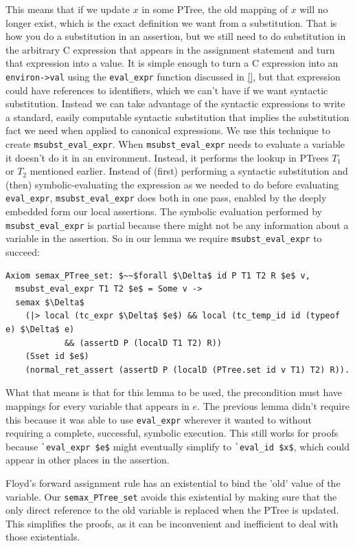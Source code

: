 \documentclass{puthesis}
\begin{document}
This means that if we update $x$ in some PTree, the old mapping of $x$
will no longer exist, which is the exact definition we want from a
substitution. That is how you do a substitution in an assertion, but
we still need to do substitution in the arbitrary C expression that
appears in the assignment statement and turn that expression into a
value. It is simple enough to turn a C expression into an
\lstinline|environ->val| using the \lstinline|eval_expr| function
discussed in \ref{}, but that expression could have references to
identifiers, which we can't have if we want syntactic
substitution. Instead we can take advantage of the syntactic
expressions to write a standard, easily computable syntactic
substitution that implies the substitution fact we need when applied
to canonical expressions. We use this technique to create
\lstinline|msubst_eval_expr|.  When \lstinline|msubst_eval_expr| needs
to evaluate a variable it doesn't do it in an environment. Instead, it
performs the lookup in PTrees $T_1$ or $T_2$ mentioned
earlier. Instead of (first) performing a syntactic substitution and
(then) symbolic-evaluating the expression as we needed to do before
evaluating \lstinline|eval_expr|, \lstinline|msubst_eval_expr| does both in one
pass, enabled by the deeply embedded form our local assertions.  The
symbolic evaluation performed by \lstinline|msubst_eval_expr| is partial
because there might not be any information about a variable in the
assertion. So in our lemma we require \lstinline|msubst_eval_expr| to
succeed:

\begin{lstlisting}
Axiom semax_PTree_set: $~~$forall $\Delta$ id P T1 T2 R $e$ v,
  msubst_eval_expr T1 T2 $e$ = Some v ->
  semax $\Delta$
    (|> local (tc_expr $\Delta$ $e$) && local (tc_temp_id id (typeof e) $\Delta$ e) 
            && (assertD P (localD T1 T2) R))
    (Sset id $e$)
    (normal_ret_assert (assertD P (localD (PTree.set id v T1) T2) R)).
\end{lstlisting}

What that means is that for this lemma to be used, the precondition
must have mappings for every variable that appears in $e$. The
previous lemma didn't require this because it was able to use
\lstinline|eval_expr| wherever it wanted to without requiring a
complete, successful, symbolic execution. This still works for proofs
because \lstinline|`eval_expr $e$| might eventually simplify to
\lstinline|`eval_id $x$|, which could appear in other places in the
assertion.

Floyd's forward assignment rule has an existential to bind the 'old'
value of the variable.  Our \lstinline|semax_PTree_set| avoids this
existential by making sure that the only direct reference to the old
variable is replaced when the PTree is updated.  This simplifies the
proofs, as it can be inconvenient and inefficient to deal with those
existentials.
\end{document}
